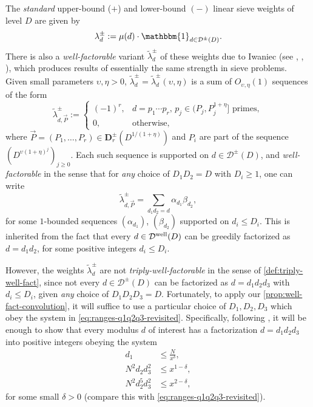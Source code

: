\documentclass[reqno,11pt]{amsart}
\theoremstyle{remark}
\numberwithin{equation}{section}
\newcommand{\bD}{\mathbf{D}}
\newcommand{\mDw}{\mathcal{D}^{\textnormal{well}}}
\newcommand{\mD}{\mathcal{D}}
\newcommand{\one}{\mathbbm{1}}
\newcommand{\eps}{\varepsilon}
\renewcommand{\tilde}{\widetilde}
\begin{document}
The \emph{standard} upper-bound ($+$) and lower-bound $(-)$ linear sieve weights of level $D$ are given by
\[
    \lambda_d^\pm := \mu(d) \cdot \one_{d \in \mD^\pm(D)}.
\]
There is also a \emph{well-factorable} variant $\tilde{\lambda}_d^{\pm}$ of these weights due to Iwaniec (see \cite[Chapter 12.7]{friedlander2010opera}, \cite{iwaniec1980new}, \cite[Chapter 8]{maynard2025primes2}), which produces results of essentially the same strength in sieve problems. Given small parameters $\upsilon, \eta > 0$, $\tilde{\lambda}_d^\pm = \tilde{\lambda}_d^\pm(\upsilon,\eta)$ is a sum of $O_{\upsilon,\eta}(1)$ sequences of the form
\[
    \tilde{\lambda}_{d,\vec{P}}^\pm := 
    \begin{cases} 
    (-1)^r, & d = p_1 \cdots p_r, \, p_j \in (P_j, P_j^{1+\eta}] \text{ primes}, \\
    0, & \text{otherwise},
    \end{cases}
\]
where $\vec{P} = (P_1, \ldots, P_r) \in \bD_r^\pm(D^{1/(1+\eta)})$ and $P_i$ are part of the sequence $(D^{\upsilon(1+\eta)^j})_{j \ge 0}$. Each such sequence is supported on $d \in \mD^\pm(D)$, and \emph{well-factorable} in the sense that for \emph{any} choice of $D_1 D_2 = D$ with $D_i \ge 1$, one can write 
\[
    \tilde{\lambda}_{d,\vec{P}}^\pm = 
    \sum_{d_1 d_2 = d} \alpha_{d_1} \beta_{d_2},
\] 
for some $1$-bounded sequences $(\alpha_{d_1})$, $(\beta_{d_2})$ supported on $d_i \le D_i$. This is inherited from the fact that every $d \in \mDw(D)$ can be greedily factorized as $d = d_1 d_2$, for some positive integers $d_i \le D_i$.

However, the weights $\tilde\lambda^\pm_d$ are not \emph{triply-well-factorable} in the sense of \cref{def:triply-well-fact}, since not every $d \in \mD^\pm(D)$ can be factorized as $d = d_1 d_2 d_3$ with $d_i \le D_i$, given \emph{any} choice of $D_1 D_2 D_3 = D$. Fortunately, to apply our \cref{prop:well-fact-convolution}, it will suffice to use a particular choice of $D_1, D_2, D_3$ which obey the system in \cref{eq:ranges-q1q2q3-revisited}. Specifically, following \cite{maynard2025primes2,lichtman2023primes}, it will be enough to show that every modulus $d$ of interest has a factorization $d = d_1 d_2 d_3$ into positive integers obeying the system
\begin{equation} \label{eq:system-to-verify}
\begin{aligned}
    d_1 &\le \frac{N}{x^\delta}, \\ 
    N^2d_2d_3^2 &\le x^{1-\delta}, \\
    N^2 d_2^5 d_3^2 &\le x^{2-\delta},
\end{aligned}
\end{equation}
for some small $\delta > 0$ (compare this with \cref{eq:ranges-q1q2q3-revisited}).%
\end{document}
